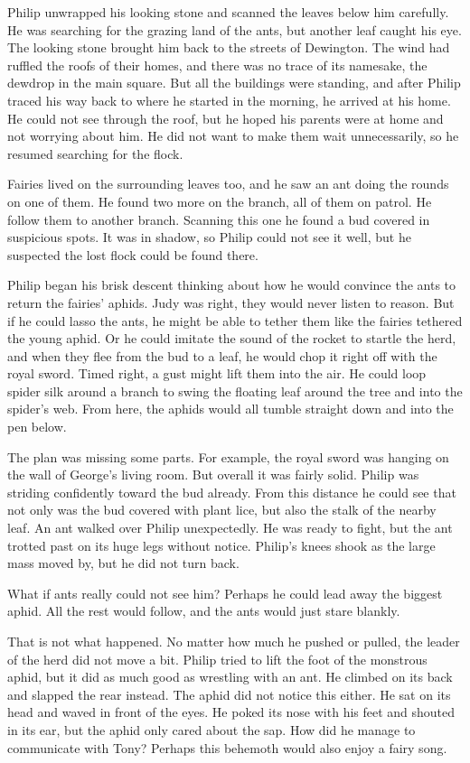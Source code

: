 \documentclass[10pt, draft]{memoir}
\begin{document}
Philip unwrapped his looking stone and scanned the leaves below him carefully.
He was searching for the grazing land of the ants, but another leaf caught his
eye. The looking stone brought him back to the streets of Dewington. The wind
had ruffled the roofs of their homes, and there was no trace of its namesake,
the dewdrop in the main square. But all the buildings were standing, and after
Philip traced his way back to where he started in the morning, he arrived at
his home. He could not see through the roof, but he hoped his parents were at
home and not worrying about him. He did not want to make them wait
unnecessarily, so he resumed searching for the flock.

Fairies lived on the surrounding leaves too, and he saw an ant doing the rounds
on one of them. He found two more on the branch, all of them on patrol. He
follow them to another branch. Scanning this one he found a bud covered in
suspicious spots. It was in shadow, so Philip could not see it well, but he
suspected the lost flock could be found there.

Philip began his brisk descent thinking about how he would convince the ants to
return the fairies' aphids. Judy was right, they would never listen to reason.
But if he could lasso the ants, he might be able to tether them like the
fairies tethered the young aphid. Or he could imitate the sound of the rocket
to startle the herd, and when they flee from the bud to a leaf, he would chop
it right off with the royal sword. Timed right, a gust might lift them into the
air. He could loop spider silk around a branch to swing the floating leaf
around the tree and into the spider's web. From here, the aphids would all
tumble straight down and into the pen below.

The plan was missing some parts. For example, the royal sword was hanging on
the wall of George's living room. But overall it was fairly solid. Philip was
striding confidently toward the bud already. From this distance he could see
that not only was the bud covered with plant lice, but also the stalk of the
nearby leaf. An ant walked over Philip unexpectedly. He was ready to fight, but
the ant trotted past on its huge legs without notice. Philip's knees shook as
the large mass moved by, but he did not turn back.

What if ants really could not see him? Perhaps he could lead away the biggest
aphid. All the rest would follow, and the ants would just stare blankly.

That is not what happened. No matter how much he pushed or pulled, the leader
of the herd did not move a bit. Philip tried to lift the foot of the monstrous
aphid, but it did as much good as wrestling with an ant. He climbed on its back
and slapped the rear instead. The aphid did not notice this either. He sat on
its head and waved in front of the eyes. He poked its nose with his feet and
shouted in its ear, but the aphid only cared about the sap. How did he manage
to communicate with Tony? Perhaps this behemoth would also enjoy a fairy song.
\end{document}
